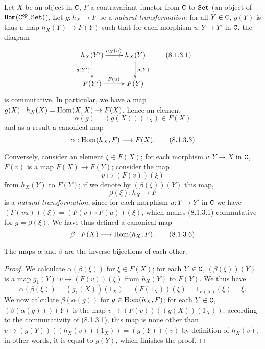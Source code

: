 \begin{env}[8.1.3]
\label{0.8.1.3}
Let $X$ be an object in $\mathtt{C}$, $F$ a contravariant functor from $\mathtt{C}$ to $\mathtt{Set}$
(an object of $\mathtt{Hom}(\mathtt{C}^\mathtt{op},\mathtt{Set})$). Let $g:h_X\to F$ be a \emph{natural transformation}: for all $Y\in\mathtt{C}$,
$g(Y)$ is thus a map $h_X(Y)\to F(Y)$ such that for each morphism $u:Y\to Y'$ in $\mathtt{C}$,
the diagram
\[
  \xymatrix{
    h_X(Y')\ar[r]^{h_X(u)}\ar[d]_{g(Y')} &
    h_X(Y)\ar[d]^{g(Y)}\\
    F(Y')\ar[r]^{F(u)} &
    F(Y)
  }
  \tag{8.1.3.1}
\]
is commutative. In particular, we have a map $g(X):h_X(X)=\Hom(X,X)\to F(X)$, hence an element
\[
  \alpha(g)=(g(X))(1_X)\in F(X)
  \tag{8.1.3.2}
\]
and as a result a canonical map
\[
  \alpha:\Hom(h_X,F)\to F(X).
  \tag{8.1.3.3}
\]

Conversely, consider an element $\xi\in F(X)$; for each morphism $v:Y\to X$ in $\mathtt{C}$, $F(v)$ is a
map $F(X)\to F(Y)$; consider the map
\[
  v\mapsto(F(v))(\xi)
  \tag{8.1.3.4}
\]
from $h_X(Y)$ to $F(Y)$; if we denote by $(\beta(\xi))(Y)$ this map,
\[
  \beta(\xi):h_X\to F
  \tag{8.1.3.5}
\]
is a \emph{natural transformation}, since for each morphism $u:Y\to Y'$ in $\mathtt{C}$ we have
$(F(vu))(\xi)=(F(v)\circ F(u))(\xi)$, which makes (8.1.3.1) commutative for $g=\beta(\xi)$.
We have thus defined a canonical map
\[
  \beta:F(X)\to\Hom(h_X,F).
  \tag{8.1.3.6}
\]
\end{env}

\begin{prop}[8.1.4]
\label{0.8.1.4}
The maps $\alpha$ and $\beta$ are the inverse bijections of each other.
\end{prop}

\begin{proof}
\label{proof-0.8.1.4}
We calculate $\alpha(\beta(\xi))$ for $\xi\in F(X)$; for each $Y\in\mathtt{C}$, $(\beta(\xi))(Y)$ is a map
$g_1(Y):v\mapsto(F(v))(\xi)$ from $h_X(Y)$ to $F(Y)$. We thus have
\[
  \alpha(\beta(\xi))=(g_1(X))(1_X)=(F(1_X))(\xi)=1_{F(X)}(\xi)=\xi.
\]
We now calculate $\beta(\alpha(g))$ for $g\in{\mathop{\mathrm{Hom}}\nolimits}(h_X,F)$; for each $Y\in\mathtt{C}$, $(\beta(\alpha(g)))(Y)$
is the map $v\mapsto(F(v))((g(X))(1_X))$; according to the commutativity of (8.1.3.1), this map
is none other than $v\mapsto(g(Y))((h_X(v))(1_X))=(g(Y))(v)$ by definition of $h_X(v)$, in other words,
it is equal to $g(Y)$, which finishes the proof.
\end{proof}

